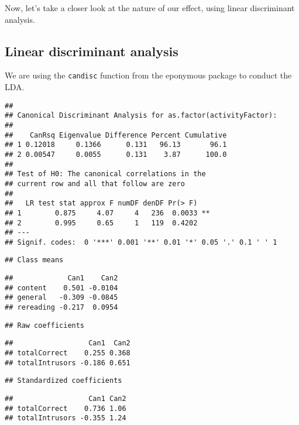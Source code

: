 \documentclass[11pt,]{article}
\begin{document}
Now, let's take a closer look at the nature of our effect, using linear
discriminant analysis.

\hypertarget{linear-discriminant-analysis}{%
\subsection{Linear discriminant
analysis}\label{linear-discriminant-analysis}}

We are using the \texttt{candisc} function from the eponymous package
\citep{friendlyCandiscVisualizingGeneralized2017} to conduct the LDA.

\begin{verbatim}
## 
## Canonical Discriminant Analysis for as.factor(activityFactor):
## 
##    CanRsq Eigenvalue Difference Percent Cumulative
## 1 0.12018     0.1366      0.131   96.13       96.1
## 2 0.00547     0.0055      0.131    3.87      100.0
## 
## Test of H0: The canonical correlations in the 
## current row and all that follow are zero
## 
##   LR test stat approx F numDF denDF Pr(> F)   
## 1        0.875     4.07     4   236  0.0033 **
## 2        0.995     0.65     1   119  0.4202   
## ---
## Signif. codes:  0 '***' 0.001 '**' 0.01 '*' 0.05 '.' 0.1 ' ' 1
\end{verbatim}

\begin{verbatim}
## Class means
\end{verbatim}

\begin{verbatim}
##             Can1    Can2
## content    0.501 -0.0104
## general   -0.309 -0.0845
## rereading -0.217  0.0954
\end{verbatim}

\begin{verbatim}
## Raw coefficients
\end{verbatim}

\begin{verbatim}
##                  Can1  Can2
## totalCorrect    0.255 0.368
## totalIntrusors -0.186 0.651
\end{verbatim}

\begin{verbatim}
## Standardized coefficients
\end{verbatim}

\begin{verbatim}
##                  Can1 Can2
## totalCorrect    0.736 1.06
## totalIntrusors -0.355 1.24
\end{verbatim}
\end{document}
